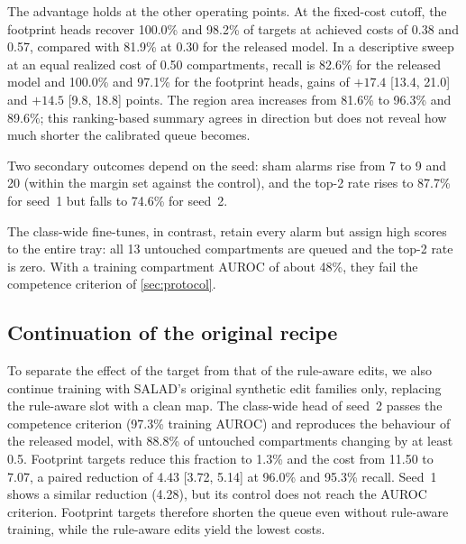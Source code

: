 The advantage holds at the other operating points. At the fixed-cost cutoff, the footprint heads recover 100.0\% and 98.2\% of targets at achieved costs of 0.38 and 0.57, compared with 81.9\% at 0.30 for the released model. In a descriptive sweep at an equal realized cost of 0.50 compartments, recall is 82.6\% for the released model and 100.0\% and 97.1\% for the footprint heads, gains of $+17.4$ [13.4, 21.0] and $+14.5$ [9.8, 18.8] points. The region area increases from 81.6\% to 96.3\% and 89.6\%; this ranking-based summary agrees in direction but does not reveal how much shorter the calibrated queue becomes.

Two secondary outcomes depend on the seed: sham alarms rise from 7 to 9 and 20 (within the margin set against the control), and the top-2 rate rises to 87.7\% for seed~1 but falls to 74.6\% for seed~2.

The class-wide fine-tunes, in contrast, retain every alarm but assign high scores to the entire tray: all 13 untouched compartments are queued and the top-2 rate is zero. With a training compartment AUROC of about 48\%, they fail the competence criterion of \cref{sec:protocol}.

\subsection{Continuation of the original recipe}
\label{sec:upstream}
To separate the effect of the target from that of the rule-aware edits, we also continue training with SALAD's original synthetic edit families only, replacing the rule-aware slot with a clean map. The class-wide head of seed~2 passes the competence criterion (97.3\% training AUROC) and reproduces the behaviour of the released model, with 88.8\% of untouched compartments changing by at least 0.5. Footprint targets reduce this fraction to 1.3\% and the cost from 11.50 to 7.07, a paired reduction of 4.43 [3.72, 5.14] at 96.0\% and 95.3\% recall. Seed~1 shows a similar reduction (4.28), but its control does not reach the AUROC criterion. Footprint targets therefore shorten the queue even without rule-aware training, while the rule-aware edits yield the lowest costs.

